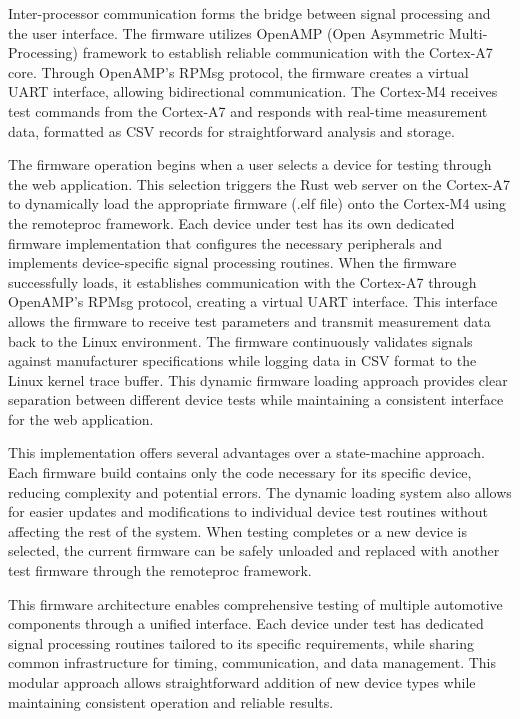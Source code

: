 \documentclass[12pt]{article}
\begin{document}
Inter-processor communication forms the bridge between signal processing and the user interface. The firmware utilizes OpenAMP (Open Asymmetric Multi-Processing) framework to establish reliable communication with the Cortex-A7 core. Through OpenAMP's RPMsg protocol, the firmware creates a virtual UART interface, allowing bidirectional communication. The Cortex-M4 receives test commands from the Cortex-A7 and responds with real-time measurement data, formatted as CSV records for straightforward analysis and storage.

The firmware operation begins when a user selects a device for testing through the web application. This selection triggers the Rust web server on the Cortex-A7 to dynamically load the appropriate firmware (.elf file) onto the Cortex-M4 using the remoteproc framework. Each device under test has its own dedicated firmware implementation that configures the necessary peripherals and implements device-specific signal processing routines. When the firmware successfully loads, it establishes communication with the Cortex-A7 through OpenAMP's RPMsg protocol, creating a virtual UART interface. This interface allows the firmware to receive test parameters and transmit measurement data back to the Linux environment. The firmware continuously validates signals against manufacturer specifications while logging data in CSV format to the Linux kernel trace buffer. This dynamic firmware loading approach provides clear separation between different device tests while maintaining a consistent interface for the web application.

This implementation offers several advantages over a state-machine approach. Each firmware build contains only the code necessary for its specific device, reducing complexity and potential errors. The dynamic loading system also allows for easier updates and modifications to individual device test routines without affecting the rest of the system. When testing completes or a new device is selected, the current firmware can be safely unloaded and replaced with another test firmware through the remoteproc framework.

This firmware architecture enables comprehensive testing of multiple automotive components through a unified interface. Each device under test has dedicated signal processing routines tailored to its specific requirements, while sharing common infrastructure for timing, communication, and data management. This modular approach allows straightforward addition of new device types while maintaining consistent operation and reliable results.
\end{document}
